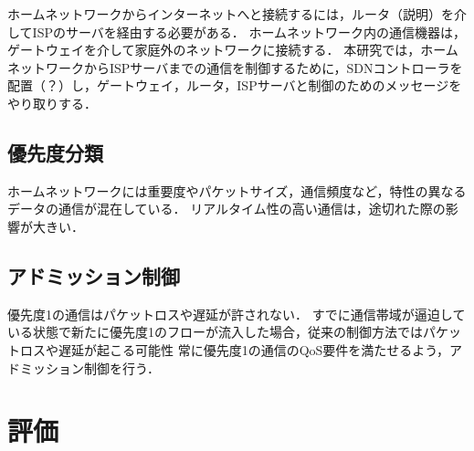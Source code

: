 \documentclass[a4paper,11pt,uplatex]{ujreport}
\begin{document}
  ホームネットワークからインターネットへと接続するには，ルータ（説明）を介してISPのサーバを経由する必要がある．
  ホームネットワーク内の通信機器は，ゲートウェイを介して家庭外のネットワークに接続する．
  本研究では，ホームネットワークからISPサーバまでの通信を制御するために，SDNコントローラを配置（？）し，ゲートウェイ，ルータ，ISPサーバと制御のためのメッセージをやり取りする．

\section{優先度分類}
\label{sec:優先度分類}

  ホームネットワークには重要度やパケットサイズ，通信頻度など，特性の異なるデータの通信が混在している．
  リアルタイム性の高い通信は，途切れた際の影響が大きい．

\section{アドミッション制御}
\label{sec:アドミッション制御}

  優先度1の通信はパケットロスや遅延が許されない．
  すでに通信帯域が逼迫している状態で新たに優先度1のフローが流入した場合，従来の制御方法ではパケットロスや遅延が起こる可能性
  常に優先度1の通信のQoS要件を満たせるよう，アドミッション制御を行う．







\chapter{評価}
\label{chap:評価}
\end{document}
